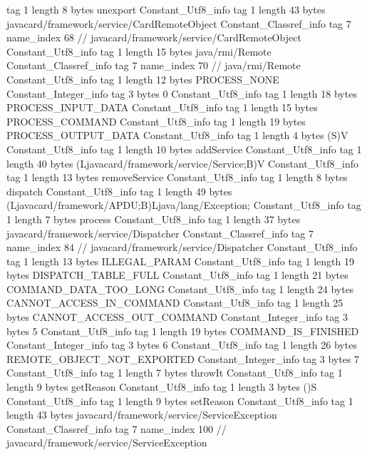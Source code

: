 {{{			tag	1
			length	8
			bytes	unexport
		}
		Constant_Utf8_info {
			tag	1
			length	43
			bytes	javacard/framework/service/CardRemoteObject
		}
		Constant_Classref_info {
			tag	7
			name_index	68		// javacard/framework/service/CardRemoteObject
		}
		Constant_Utf8_info {
			tag	1
			length	15
			bytes	java/rmi/Remote
		}
		Constant_Classref_info {
			tag	7
			name_index	70		// java/rmi/Remote
		}
		Constant_Utf8_info {
			tag	1
			length	12
			bytes	PROCESS_NONE
		}
		Constant_Integer_info {
			tag	3
			bytes	0
		}
		Constant_Utf8_info {
			tag	1
			length	18
			bytes	PROCESS_INPUT_DATA
		}
		Constant_Utf8_info {
			tag	1
			length	15
			bytes	PROCESS_COMMAND
		}
		Constant_Utf8_info {
			tag	1
			length	19
			bytes	PROCESS_OUTPUT_DATA
		}
		Constant_Utf8_info {
			tag	1
			length	4
			bytes	(S)V
		}
		Constant_Utf8_info {
			tag	1
			length	10
			bytes	addService
		}
		Constant_Utf8_info {
			tag	1
			length	40
			bytes	(Ljavacard/framework/service/Service;B)V
		}
		Constant_Utf8_info {
			tag	1
			length	13
			bytes	removeService
		}
		Constant_Utf8_info {
			tag	1
			length	8
			bytes	dispatch
		}
		Constant_Utf8_info {
			tag	1
			length	49
			bytes	(Ljavacard/framework/APDU;B)Ljava/lang/Exception;
		}
		Constant_Utf8_info {
			tag	1
			length	7
			bytes	process
		}
		Constant_Utf8_info {
			tag	1
			length	37
			bytes	javacard/framework/service/Dispatcher
		}
		Constant_Classref_info {
			tag	7
			name_index	84		// javacard/framework/service/Dispatcher
		}
		Constant_Utf8_info {
			tag	1
			length	13
			bytes	ILLEGAL_PARAM
		}
		Constant_Utf8_info {
			tag	1
			length	19
			bytes	DISPATCH_TABLE_FULL
		}
		Constant_Utf8_info {
			tag	1
			length	21
			bytes	COMMAND_DATA_TOO_LONG
		}
		Constant_Utf8_info {
			tag	1
			length	24
			bytes	CANNOT_ACCESS_IN_COMMAND
		}
		Constant_Utf8_info {
			tag	1
			length	25
			bytes	CANNOT_ACCESS_OUT_COMMAND
		}
		Constant_Integer_info {
			tag	3
			bytes	5
		}
		Constant_Utf8_info {
			tag	1
			length	19
			bytes	COMMAND_IS_FINISHED
		}
		Constant_Integer_info {
			tag	3
			bytes	6
		}
		Constant_Utf8_info {
			tag	1
			length	26
			bytes	REMOTE_OBJECT_NOT_EXPORTED
		}
		Constant_Integer_info {
			tag	3
			bytes	7
		}
		Constant_Utf8_info {
			tag	1
			length	7
			bytes	throwIt
		}
		Constant_Utf8_info {
			tag	1
			length	9
			bytes	getReason
		}
		Constant_Utf8_info {
			tag	1
			length	3
			bytes	()S
		}
		Constant_Utf8_info {
			tag	1
			length	9
			bytes	setReason
		}
		Constant_Utf8_info {
			tag	1
			length	43
			bytes	javacard/framework/service/ServiceException
		}
		Constant_Classref_info {
			tag	7
			name_index	100		// javacard/framework/service/ServiceException
}}}
